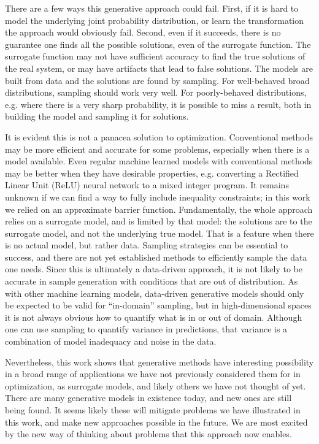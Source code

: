 \documentclass{achemso}
\begin{document}
There are a few ways this generative approach could fail. First, if it is hard to model the underlying joint probability distribution, or learn the transformation the approach would obviously fail. Second, even if it succeeds, there is no guarantee one finds all the possible solutions, even of the surrogate function. The surrogate function may not have sufficient accuracy to find the true solutions of the real system, or may have artifacts that lead to false solutions. The models are built from data and the solutions are found by sampling. For well-behaved broad distributions, sampling should work very well. For poorly-behaved distributions, e.g. where there is a very sharp probability, it is possible to miss a result, both in building the model and sampling it for solutions.

It is evident this is not a panacea solution to optimization. Conventional methods may be more efficient and accurate for some problems, especially when there is a model available. Even regular machine learned models with conventional methods may be better when they have desirable properties, e.g. converting a Rectified Linear Unit (ReLU) neural network to a mixed integer program. It remains unknown if we can find a way to fully include inequality constraints; in this work we relied on an approximate barrier function. Fundamentally, the whole approach relies on a surrogate model, and is limited by that model: the solutions are to the surrogate model, and not the underlying true model. That is a feature when there is no actual model, but rather data. Sampling strategies can be essential to success, and there are not yet established methods to efficiently sample the data one needs. Since this is ultimately a data-driven approach, it is not likely to be accurate in sample generation with conditions that are out of distribution. As with other machine learning models, data-driven generative models should only be expected to be valid for ``in-domain'' sampling, but in high-dimensional spaces it is not always obvious how to quantify what is in or out of domain. Although one can use sampling to quantify variance in predictions, that variance is a combination of model inadequacy and noise in the data.

Nevertheless, this work shows that generative methods have interesting possibility in a broad range of applications we have not previously considered them for in optimization, as surrogate models, and likely others we have not thought of yet. There are many generative models in existence today, and new ones are still being found. It seems likely these will mitigate problems we have illustrated in this work, and make new approaches possible in the future. We are most excited by the new way of thinking about problems that this approach now enables.
\end{document}
